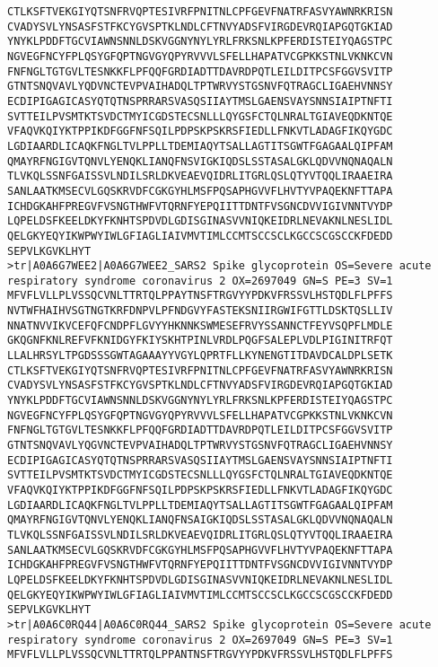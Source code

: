 \begin{lstlisting}
CTLKSFTVEKGIYQTSNFRVQPTESIVRFPNITNLCPFGEVFNATRFASVYAWNRKRISN
CVADYSVLYNSASFSTFKCYGVSPTKLNDLCFTNVYADSFVIRGDEVRQIAPGQTGKIAD
YNYKLPDDFTGCVIAWNSNNLDSKVGGNYNYLYRLFRKSNLKPFERDISTEIYQAGSTPC
NGVEGFNCYFPLQSYGFQPTNGVGYQPYRVVVLSFELLHAPATVCGPKKSTNLVKNKCVN
FNFNGLTGTGVLTESNKKFLPFQQFGRDIADTTDAVRDPQTLEILDITPCSFGGVSVITP
GTNTSNQVAVLYQDVNCTEVPVAIHADQLTPTWRVYSTGSNVFQTRAGCLIGAEHVNNSY
ECDIPIGAGICASYQTQTNSPRRARSVASQSIIAYTMSLGAENSVAYSNNSIAIPTNFTI
SVTTEILPVSMTKTSVDCTMYICGDSTECSNLLLQYGSFCTQLNRALTGIAVEQDKNTQE
VFAQVKQIYKTPPIKDFGGFNFSQILPDPSKPSKRSFIEDLLFNKVTLADAGFIKQYGDC
LGDIAARDLICAQKFNGLTVLPPLLTDEMIAQYTSALLAGTITSGWTFGAGAALQIPFAM
QMAYRFNGIGVTQNVLYENQKLIANQFNSVIGKIQDSLSSTASALGKLQDVVNQNAQALN
TLVKQLSSNFGAISSVLNDILSRLDKVEAEVQIDRLITGRLQSLQTYVTQQLIRAAEIRA
SANLAATKMSECVLGQSKRVDFCGKGYHLMSFPQSAPHGVVFLHVTYVPAQEKNFTTAPA
ICHDGKAHFPREGVFVSNGTHWFVTQRNFYEPQIITTDNTFVSGNCDVVIGIVNNTVYDP
LQPELDSFKEELDKYFKNHTSPDVDLGDISGINASVVNIQKEIDRLNEVAKNLNESLIDL
QELGKYEQYIKWPWYIWLGFIAGLIAIVMVTIMLCCMTSCCSCLKGCCSCGSCCKFDEDD
SEPVLKGVKLHYT
>tr|A0A6G7WEE2|A0A6G7WEE2_SARS2 Spike glycoprotein OS=Severe acute respiratory syndrome coronavirus 2 OX=2697049 GN=S PE=3 SV=1
MFVFLVLLPLVSSQCVNLTTRTQLPPAYTNSFTRGVYYPDKVFRSSVLHSTQDLFLPFFS
NVTWFHAIHVSGTNGTKRFDNPVLPFNDGVYFASTEKSNIIRGWIFGTTLDSKTQSLLIV
NNATNVVIKVCEFQFCNDPFLGVYYHKNNKSWMESEFRVYSSANNCTFEYVSQPFLMDLE
GKQGNFKNLREFVFKNIDGYFKIYSKHTPINLVRDLPQGFSALEPLVDLPIGINITRFQT
LLALHRSYLTPGDSSSGWTAGAAAYYVGYLQPRTFLLKYNENGTITDAVDCALDPLSETK
CTLKSFTVEKGIYQTSNFRVQPTESIVRFPNITNLCPFGEVFNATRFASVYAWNRKRISN
CVADYSVLYNSASFSTFKCYGVSPTKLNDLCFTNVYADSFVIRGDEVRQIAPGQTGKIAD
YNYKLPDDFTGCVIAWNSNNLDSKVGGNYNYLYRLFRKSNLKPFERDISTEIYQAGSTPC
NGVEGFNCYFPLQSYGFQPTNGVGYQPYRVVVLSFELLHAPATVCGPKKSTNLVKNKCVN
FNFNGLTGTGVLTESNKKFLPFQQFGRDIADTTDAVRDPQTLEILDITPCSFGGVSVITP
GTNTSNQVAVLYQGVNCTEVPVAIHADQLTPTWRVYSTGSNVFQTRAGCLIGAEHVNNSY
ECDIPIGAGICASYQTQTNSPRRARSVASQSIIAYTMSLGAENSVAYSNNSIAIPTNFTI
SVTTEILPVSMTKTSVDCTMYICGDSTECSNLLLQYGSFCTQLNRALTGIAVEQDKNTQE
VFAQVKQIYKTPPIKDFGGFNFSQILPDPSKPSKRSFIEDLLFNKVTLADAGFIKQYGDC
LGDIAARDLICAQKFNGLTVLPPLLTDEMIAQYTSALLAGTITSGWTFGAGAALQIPFAM
QMAYRFNGIGVTQNVLYENQKLIANQFNSAIGKIQDSLSSTASALGKLQDVVNQNAQALN
TLVKQLSSNFGAISSVLNDILSRLDKVEAEVQIDRLITGRLQSLQTYVTQQLIRAAEIRA
SANLAATKMSECVLGQSKRVDFCGKGYHLMSFPQSAPHGVVFLHVTYVPAQEKNFTTAPA
ICHDGKAHFPREGVFVSNGTHWFVTQRNFYEPQIITTDNTFVSGNCDVVIGIVNNTVYDP
LQPELDSFKEELDKYFKNHTSPDVDLGDISGINASVVNIQKEIDRLNEVAKNLNESLIDL
QELGKYEQYIKWPWYIWLGFIAGLIAIVMVTIMLCCMTSCCSCLKGCCSCGSCCKFDEDD
SEPVLKGVKLHYT
>tr|A0A6C0RQ44|A0A6C0RQ44_SARS2 Spike glycoprotein OS=Severe acute respiratory syndrome coronavirus 2 OX=2697049 GN=S PE=3 SV=1
MFVFLVLLPLVSSQCVNLTTRTQLPPANTNSFTRGVYYPDKVFRSSVLHSTQDLFLPFFS

\end{lstlisting}
